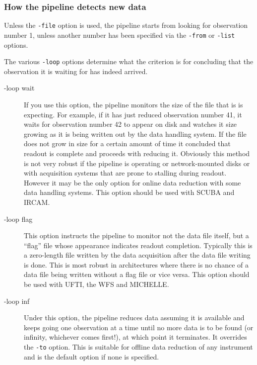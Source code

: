 \documentclass[twoside,11pt]{article}
\renewcommand{\_}{\texttt{\symbol{95}}}
\begin{document}
\subsubsection*{How the pipeline detects new data\label{The_ORAC-DR_Data_Loops_How_the_pipeline_detects_new_data}}

Unless the \texttt{-file} option is used, the pipeline starts from looking for observation number 1, unless another number has been specified via the 
\texttt{-from} or \texttt{-list} options.



The various \texttt{-loop} options determine what the criterion is for
concluding that the observation it is waiting for has indeed arrived.

\begin{description}
\item[-loop wait] \mbox{}

If you use this option, the pipeline monitors the size of the file
that is is expecting. For example, if it has just reduced observation
number 41, it waits for observation number 42 to appear on disk and
watches it size growing as it is being written out by the data
handling system. If the file does not grow in size for a certain
amount of time it concluded that readout is complete and proceeds with
reducing it. Obviously this method is not very robust if the pipeline
is operating or network-mounted disks or with acquisition systems that
are prone to stalling during readout. However it may be the only
option for online data reduction with some data handling systems. This
option should be used with SCUBA and IRCAM.

\item[-loop flag] \mbox{}

This option instructs the pipeline to monitor not the data file
itself, but a ``flag'' file whose appearance indicates readout
completion. Typically this is a zero-length file written by the data
acquisition after the data file writing is done. This is most robust
in architectures where there is no chance of a data file being written
without a flag file or vice versa. This option should be used with
UFTI, the WFS and MICHELLE.

\item[-loop inf] \mbox{}

Under this option, the pipeline reduces data assuming it is available
and keeps going one observation at a time until no more data is to be
found (or infinity, whichever comes first!), at which point it
terminates. It overrides the \texttt{-to} option. This is suitable for offline
data reduction of any instrument and is the default option if none is
specified.


\end{description}
\end{document}
